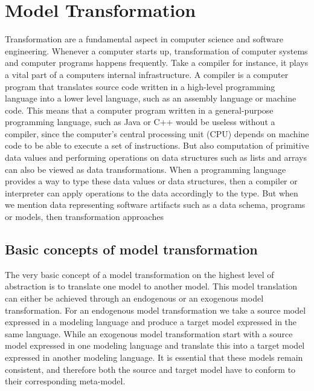
\chapter{Model Transformation} %

\label{Chapter3} %



Transformation are a fundamental aspect in computer science and software
engineering. Whenever a computer starts up, transformation of computer systems
and computer programs happens frequently. Take a compiler for instance, it plays
a vital part of a computers internal infrastructure. A compiler is a computer
program that translates source code written in a high-level programming
language into a lower level language, such as an assembly language or machine
code. This means that a computer program written in a general-purpose
programming language, such as Java or C++ would be useless without a compiler,
since the computer's central processing unit (CPU) depends on machine code to be
able to execute a set of instructions. But also computation of primitive data
values and performing operations on data structures such as lists and arrays can
also be viewed as data transformations. When a programming language provides a way
to type these data values or data structures, then a compiler or interpreter can
apply operations to the data accordingly to the type. But when we mention
data representing software artifacts such as a data schema, programs or models,
then transformation approaches 

\section{Basic concepts of model transformation}

The very basic concept of a model transformation on the highest level of
abstraction is to translate one model to another model. This model translation
can either be achieved through an endogenous or an exogenous model
transformation. For an endogenous model transformation we take a source model
expressed in a modeling language and produce a target model expressed in the
same language. While an exogenous model transformation start with a source
model expressed in one modeling language and translate this into a target model
expressed in another modeling language. It is essential that these models
remain consistent, and therefore both the source and target model have to
conform to their corresponding meta-model.


